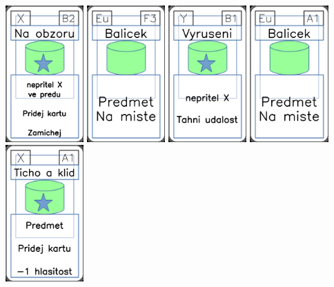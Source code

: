 \documentclass[a4paper]{article}
\begin{document}
	\includegraphics[width=3.0cm]{img-5_6}
	\includegraphics[width=3.0cm]{img-4_27}
	\includegraphics[width=3.0cm]{img-5_35}
	\includegraphics[width=3.0cm]{img-4_30}
	\includegraphics[width=3.0cm]{img-5_0}
\end{document}
